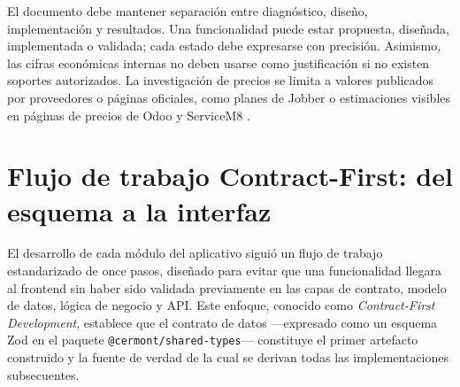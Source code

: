 El documento debe mantener separación entre diagnóstico, diseño, implementación y resultados. Una funcionalidad puede estar propuesta, diseñada, implementada o validada; cada estado debe expresarse con precisión. Asimismo, las cifras económicas internas no deben usarse como justificación si no existen soportes autorizados. La investigación de precios se limita a valores publicados por proveedores o páginas oficiales, como planes de Jobber o estimaciones visibles en páginas de precios de Odoo y ServiceM8 \cite{jobber_pricing,odoo_pricing,servicem8_pricing}.

\section{Flujo de trabajo Contract-First: del esquema a la interfaz}
\label{sec:contract-first}

El desarrollo de cada módulo del aplicativo siguió un flujo de trabajo estandarizado de once pasos, diseñado para evitar que una funcionalidad llegara al frontend sin haber sido validada previamente en las capas de contrato, modelo de datos, lógica de negocio y API. Este enfoque, conocido como \textit{Contract-First Development}, establece que el contrato de datos —expresado como un esquema Zod en el paquete \texttt{@cermont/shared-types}— constituye el primer artefacto construido y la fuente de verdad de la cual se derivan todas las implementaciones subsecuentes.

